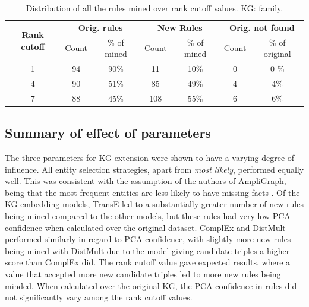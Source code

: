 \begin{table}[htp]
\centering
\begin{tabular}{ccccccc}
\multirow{2}{*}{\textbf{Rank cutoff}} & \multicolumn{2}{c}{\textbf{Orig. rules}} & \multicolumn{2}{c}{\textbf{New Rules}}   & \multicolumn{2}{c}{\textbf{Orig. not found}} \\
                                      & Count & \multicolumn{1}{c|}{\% of mined} & Count & \multicolumn{1}{c|}{\% of mined} & Count            & \% of original            \\ \hline
\multicolumn{1}{c|}{1}                & 94    & \multicolumn{1}{c|}{90\%}        & 11    & \multicolumn{1}{c|}{10\%}        & 0                & 0 \%                        \\
\multicolumn{1}{c|}{4}                & 90    & \multicolumn{1}{c|}{51\%}        & 85    & \multicolumn{1}{c|}{49\%}        & 4                & 4\%                       \\
\multicolumn{1}{c|}{7}                & 88    & \multicolumn{1}{c|}{45\%}        & 108   & \multicolumn{1}{c|}{55\%}        & 6                & 6\%                      
\end{tabular}
\caption[Dist. of rules over rank cutoff - family KG.]{Distribution of all the rules mined over rank cutoff values. KG: family.}
\label{Tab:table_rules_ranks_family}
\end{table}
    
\subsection{Summary of effect of parameters}
The three parameters for KG extension were shown to have a varying degree of influence. All entity selection strategies, apart from \textit{most likely}, performed equally well. This was consistent with the assumption of the authors of AmpliGraph, being that the most frequent entities are less likely to have missing facts \cite{ampligraph}. Of the KG embedding models, TransE led to a substantially greater number of new rules being mined compared to the other models, but these rules had very low PCA confidence when calculated over the original dataset. ComplEx and DistMult performed similarly in regard to PCA confidence, with slightly more new rules being mined with DistMult due to the model giving candidate triples a higher score than ComplEx did. The rank cutoff value gave expected results, where a value that accepted more new candidate triples led to more new rules being minded. When calculated over the original KG, the PCA confidence in rules did not significantly vary among the rank cutoff values. 

